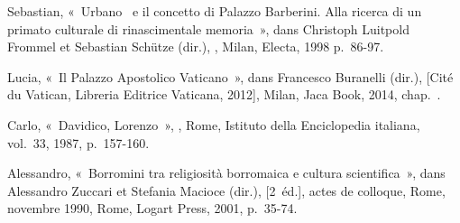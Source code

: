 \begin{teiElement}[name={TEI},change={commons\_edition}]
\begin{teiElement}[name={text},type={book},xmlid={book}]
\begin{teiElement}[name={group},type={book},xmlid={book-001}]
\begin{teiElement}[name={group},type={bibliography},data-page-title={Sources et bibliographie},data-include-href={Ch14\_Source\_bibliographie.xml},xmlid={bibliography-001}]
\begin{teiElement}[name={body}]
\begin{teiDiv}[type={section1},xmlid={div18}]
\begin{teiDiv}[type={section2},xmlid={div19}]
\begin{teiBibl}[xmlid={bibl-418}]
 Sebastian, « Urbano  e il concetto di Palazzo Barberini. Alla ricerca di un primato culturale di rinascimentale memoria », dans Christoph Luitpold Frommel et Sebastian Schütze (dir.), , Milan, Electa, 1998 p. 86-97.
\end{teiBibl}
              \begin{teiBibl}[xmlid={bibl-419}]
 Lucia, « Il Palazzo Apostolico Vaticano », dans Francesco Buranelli (dir.),  [Cité du Vatican, Libreria Editrice Vaticana, 2012], Milan, Jaca Book, 2014, chap. .
\end{teiBibl}
              \begin{teiBibl}[xmlid={bibl-420}]
 Carlo, « Davidico, Lorenzo », , Rome, Istituto della Enciclopedia italiana, vol. 33, 1987, p. 157-160.
\end{teiBibl}
              \begin{teiBibl}[xmlid={bibl-421}]
 Alessandro, « Borromini tra religiosità borromaica e cultura scientifica », dans Alessandro Zuccari et Stefania Macioce (dir.),  [2 éd.], actes de colloque, Rome, novembre 1990, Rome, Logart Press, 2001, p. 35-74.
\end{teiBibl}
            
\end{teiDiv}
            \begin{teiDiv}[type={section2},xmlid={div20}]


\end{teiDiv}
\end{teiDiv}
\end{teiElement}
\end{teiElement}
\end{teiElement}
\end{teiElement}
\end{teiElement}
